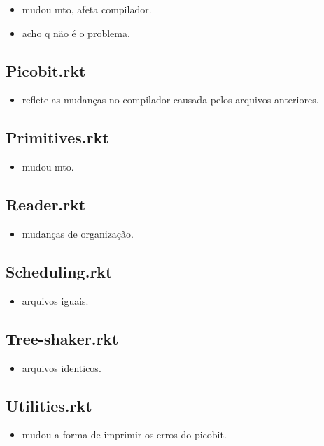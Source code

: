 \documentclass[11pt]{article}
\begin{document}
\begin{itemize}
\item mudou mto, afeta compilador.
\item acho q não é o problema.
\end{itemize}

\subsection{Picobit.rkt}
\label{sec-14-16}

\begin{itemize}
\item reflete as mudanças no compilador causada pelos arquivos anteriores.
\end{itemize}

\subsection{Primitives.rkt}
\label{sec-14-17}

\begin{itemize}
\item mudou mto.
\end{itemize}

\subsection{Reader.rkt}
\label{sec-14-18}

\begin{itemize}
\item mudanças de organização.
\end{itemize}

\subsection{Scheduling.rkt}
\label{sec-14-19}

\begin{itemize}
\item arquivos iguais.
\end{itemize}

\subsection{Tree-shaker.rkt}
\label{sec-14-20}

\begin{itemize}
\item arquivos identicos.
\end{itemize}

\subsection{Utilities.rkt}
\label{sec-14-21}

\begin{itemize}
\item mudou a forma de imprimir os erros do picobit.
\end{itemize}
\end{document}

